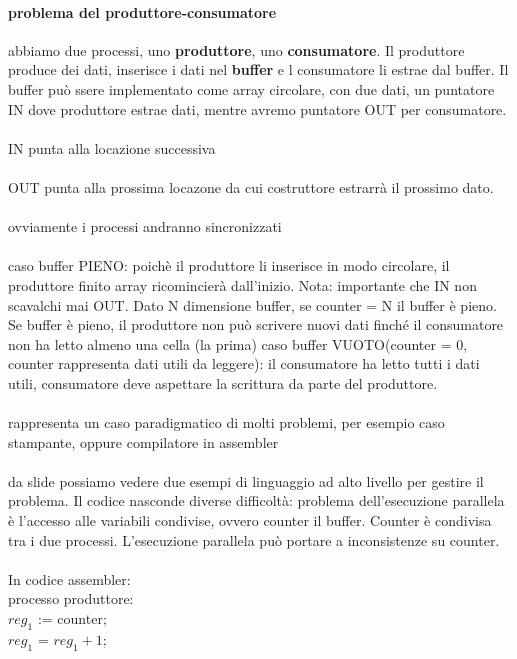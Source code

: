 \documentclass{article}
\begin{document}
\paragraph{problema del produttore-consumatore} abbiamo due processi, uno \textbf{produttore}, uno \textbf{consumatore}. Il produttore produce dei dati, inserisce i dati nel \textbf{buffer} e l consumatore li estrae dal buffer. Il buffer può ssere implementato come array circolare, con due dati, un puntatore IN dove produttore estrae dati, mentre avremo puntatore OUT per consumatore.
\\
\\
IN punta alla locazione successiva
\\
\\
OUT punta alla prossima locazone da cui costruttore estrarrà il prossimo dato.
\\
\\
ovviamente i processi andranno sincronizzati
\\
\\
caso buffer PIENO: poichè il produttore li inserisce in modo circolare, il produttore finito array ricomincierà dall'inizio. Nota: importante che IN non scavalchi mai OUT.
Dato N dimensione buffer, se counter = N il buffer è pieno. Se buffer è pieno, il produttore non può scrivere nuovi dati finché il consumatore non ha letto almeno una cella (la prima)
\newline 
\newline
caso buffer VUOTO(counter = 0, counter rappresenta dati utili da leggere): il consumatore ha letto tutti i dati utili, consumatore deve aspettare la scrittura da parte del produttore.
\\
\\
rappresenta un caso paradigmatico di molti problemi, per esempio caso stampante, oppure compilatore in assembler
\\
\\
da slide possiamo vedere due esempi di linguaggio ad alto livello per gestire il problema. Il codice nasconde diverse difficoltà: problema dell'esecuzione parallela è l'accesso alle variabili condivise, ovvero counter il buffer. Counter è condivisa tra i due processi. 
L'esecuzione parallela può portare a inconsistenze su counter.
\\ \\
In codice assembler: \\
processo produttore:\\
$reg_1$ := counter;\\
$reg_1$ = $reg_1 + 1$;\\ 
\end{document}
